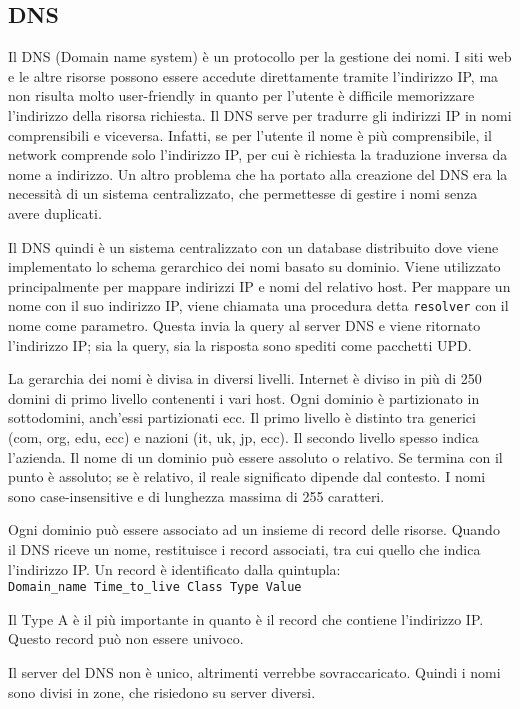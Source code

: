 \subsection{DNS}

Il DNS (Domain name system) è un protocollo per la gestione dei nomi.
I siti web e le altre risorse possono essere accedute direttamente tramite l'indirizzo IP,
ma non risulta molto user-friendly in quanto per l'utente è difficile memorizzare l'indirizzo della risorsa richiesta.
Il DNS serve per tradurre gli indirizzi IP in nomi comprensibili e viceversa.
Infatti, se per l'utente il nome è più comprensibile, il network comprende solo l'indirizzo IP, per cui è richiesta la traduzione inversa da nome a indirizzo.
Un altro problema che ha portato alla creazione del DNS era la necessità di un sistema centralizzato, che permettesse di gestire i nomi senza avere duplicati.

Il DNS quindi è un sistema centralizzato con un database distribuito dove viene implementato lo schema gerarchico dei nomi basato su dominio. 
Viene utilizzato principalmente per mappare indirizzi IP e nomi del relativo host.
Per mappare un nome con il suo indirizzo IP, viene chiamata una procedura detta \texttt{resolver} con il nome come parametro.
Questa invia la query al server DNS e viene ritornato l'indirizzo IP; sia la query, sia la risposta sono spediti come pacchetti UPD.

La gerarchia dei nomi è divisa in diversi livelli. 
Internet è diviso in più di 250 domini di primo livello contenenti i vari host. 
Ogni dominio è partizionato in sottodomini, anch'essi partizionati ecc.
Il primo livello è distinto tra generici (com, org, edu, ecc) e nazioni (it, uk, jp, ecc).
Il secondo livello spesso indica l'azienda.
Il nome di un dominio può essere assoluto o relativo.
Se termina con il punto è assoluto; se è relativo, il reale significato dipende dal contesto.
I nomi sono case-insensitive e di lunghezza massima di 255 caratteri.

Ogni dominio può essere associato ad un insieme di record delle risorse.
Quando il DNS riceve un nome, restituisce i record associati, tra cui quello che indica l'indirizzo IP.
Un record è identificato dalla quintupla:\\
\texttt{Domain\_name Time\_to\_live Class Type Value}

Il Type A è il più importante in quanto è il record che contiene l'indirizzo IP. Questo record può non essere univoco.

Il server del DNS non è unico, altrimenti verrebbe sovraccaricato. Quindi i nomi sono divisi in zone, che risiedono su server diversi. 

